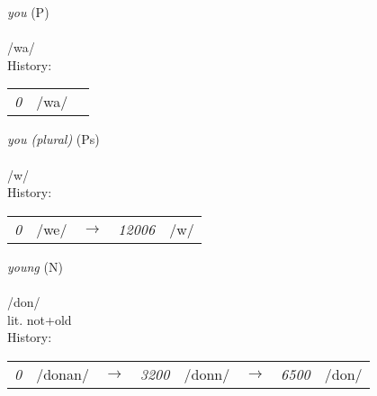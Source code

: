 \vspace{15pt}
\begin{nopagebreak}
 \textit{you} (P)\\
\\
\noindent /w{\textprimstress}a/\\


\noindent History:

\vspace{-0pt}
\hspace{40pt}
\begin{tabular}{ccc}
\textit{0} & /wa/& \\
\end{tabular}

\vspace{20pt}\hline

\end{nopagebreak}
\filbreak



\vspace{15pt}
\begin{nopagebreak}
 \textit{you (plural)} (Ps)\\
\\
\noindent /w/\\


\noindent History:

\vspace{-0pt}
\hspace{40pt}
\begin{tabular}{ccc}
\textit{0} & /we/&$\rightarrow$ & \textit{12006} & /w/& \\
\end{tabular}

\vspace{20pt}\hline

\end{nopagebreak}
\filbreak



\vspace{15pt}
\begin{nopagebreak}
 \textit{young} (N)\\
\\
\noindent /d{\textprimstress}on/\\
\noindent lit. not+old\\


\noindent History:

\vspace{-0pt}
\hspace{40pt}
\begin{tabular}{ccc}
\textit{0} & /donan/&$\rightarrow$ & \textit{3200} & /donn/&$\rightarrow$ & \textit{6500} & /don/& \\
\end{tabular}

\vspace{20pt}\hline

\end{nopagebreak}
\filbreak



\onecolumn
